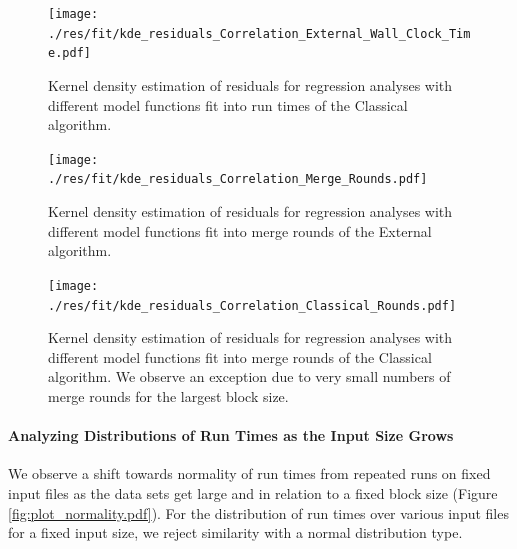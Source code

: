 \documentclass[twocolumn]{article}
\begin{document}
\begin{figure}[htb]
    \begin{minipage}{0.475 \textwidth}
        \centering
        \texttt{[image: ./res/fit/kde\_residuals\_Correlation\_External\_Wall\_Clock\_Time.pdf]}
        \caption{Kernel density estimation of residuals for regression analyses with different model functions fit into run times of the Classical algorithm.}
        \label{fig:kde_residuals_Correlation_Classical_Wall_Clock_Time.pdf}
    \end{minipage}
\end{figure}

\begin{figure}[htb]
    \begin{minipage}{0.475 \textwidth}
        \centering
        \texttt{[image: ./res/fit/kde\_residuals\_Correlation\_Merge\_Rounds.pdf]}
        \caption{Kernel density estimation of residuals for regression analyses with different model functions fit into merge rounds of the External algorithm.}
        \label{fig:kde_residuals_Correlation_Merge_Rounds.pdf}
    \end{minipage}
\end{figure}

\begin{figure}[htb]
    \begin{minipage}{0.475 \textwidth}
        \centering
        \texttt{[image: ./res/fit/kde\_residuals\_Correlation\_Classical\_Rounds.pdf]}
        \caption{Kernel density estimation of residuals for regression analyses with different model functions fit into merge rounds of the Classical algorithm. We observe an exception due to very small numbers of merge rounds for the largest block size.}
        \label{fig:kde_residuals_Correlation_Classical_Rounds.pdf}
    \end{minipage}
\end{figure}

\paragraph*{Analyzing Distributions of Run Times as the Input Size Grows}
We observe a shift towards normality of run times from repeated runs on fixed input files as the data sets get large and in relation to a fixed block size (Figure \ref{fig:plot_normality.pdf}).
For the distribution of run times over various input files for a fixed input size, we reject similarity with a normal distribution type.
\end{document}

